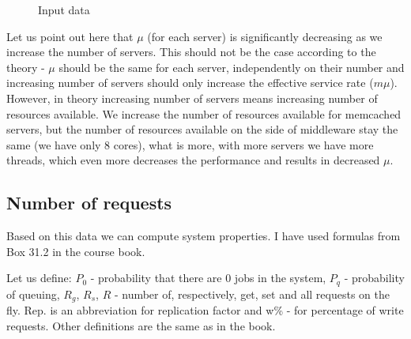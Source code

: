 \documentclass[11pt]{article}
\newcommand{\rowstyle}[1]{\gdef\currentrowstyle{#1}%
  #1\ignorespaces
}
\begin{document}
\begin{figure}
\label{fig:input}
\begin{center}
\caption{Input data}
\end{center}
\end{figure}

Let us point out here that $\mu$ (for each server) is significantly decreasing as we increase the number of servers. This should not be the case according to the theory - $\mu$ should be the same for each server, independently on their number and increasing number of servers should only increase the effective service rate ($m\mu$). However, in theory increasing number of servers means increasing number of resources available. We increase the number of resources available for memcached servers, but the number of resources available on the side of middleware stay the same (we have only 8 cores), what is more, with more servers we have more threads, which even more decreases the performance and results in decreased $\mu$.

\subsection{Number of requests}

Based on this data we can compute system properties. I have used formulas from Box 31.2 in the course book.

Let us define: $P_0$ - probability that there are 0 jobs in the system, $P_q$ - probability of queuing, $R_g$, $R_s$, $R$ - number of, respectively, get, set and all requests on the fly. Rep. is an abbreviation for replication factor and w\% - for percentage of write requests. Other definitions are the same as in the book.
\end{document}
